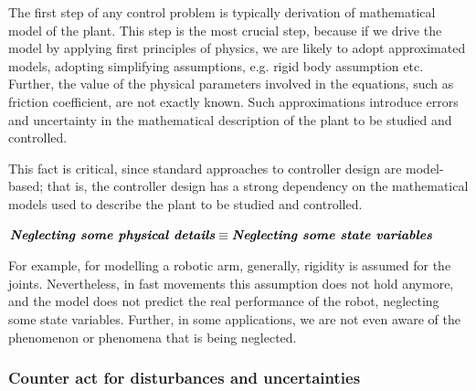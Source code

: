     The first step of any control problem is typically derivation of mathematical model of the plant. This step is the most crucial step, because if we drive the model by applying first principles of physics, we are likely to adopt approximated models, adopting simplifying assumptions, e.g. rigid body assumption etc. Further, the value of the physical parameters involved in the equations, such as friction coefficient, are not exactly known. Such approximations introduce errors and uncertainty in the mathematical description of the plant to be studied and controlled.

    This fact is critical, since standard approaches to controller design are model-based; that is, the controller design has a strong dependency on the mathematical models used to describe the plant to be studied and controlled.


\begin{center}
$\textit{\textbf{Neglecting some physical details}} \equiv \textit{\textbf{Neglecting some state variables}}$
\end{center}

    For example, for modelling a robotic arm, generally, rigidity is assumed for the joints. Nevertheless, in fast movements  this assumption does not hold anymore, and the model does not predict the real performance of the robot, neglecting some state variables. Further, in some applications, we are not even aware of the phenomenon or phenomena that is being neglected. 

\subsubsection{Counter act for disturbances and uncertainties}

